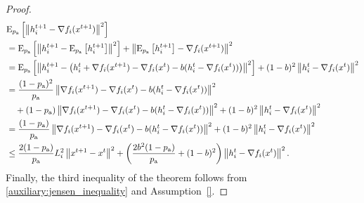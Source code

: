 \documentclass{article}
\newcommand*{\probavailable}{\ensuremath{p_{\textnormal{a}}}}
\begin{document}
\begin{proof}
  \begin{align*}
    &\ExpSub{\probavailable}{\norm{h^{t+1}_i - \nabla f_i(x^{t+1})}^2} \\
    &=\ExpSub{\probavailable}{\norm{h^{t+1}_i - \ExpSub{\probavailable}{h^{t+1}_i}}^2} + \norm{\ExpSub{\probavailable}{h^{t+1}_i  } - \nabla f_i(x^{t+1})}^2 \\
    &=\ExpSub{\probavailable}{\norm{h^{t+1}_i - \left(h^{t}_i + \nabla f_i(x^{t+1}) - \nabla f_i(x^{t}) - b(h^t_i - \nabla f_i(x^{t}))\right)}^2} + (1 - b)^2 \norm{h^{t}_i - \nabla f_i(x^{t})}^2 \\
    &=\frac{(1 - \probavailable)^2}{\probavailable} \norm{\nabla f_i(x^{t+1}) - \nabla f_i(x^{t}) - b(h^t_i - \nabla f_i(x^{t}))}^2 \\
    &\quad + (1 - \probavailable)\norm{\nabla f_i(x^{t+1}) - \nabla f_i(x^{t}) - b(h^t_i - \nabla f_i(x^{t}))}^2 + (1 - b)^2 \norm{h^{t}_i - \nabla f_i(x^{t})}^2 \\
    &=\frac{(1 - \probavailable)}{\probavailable} \norm{\nabla f_i(x^{t+1}) - \nabla f_i(x^{t}) - b(h^t_i - \nabla f_i(x^{t}))}^2 + (1 - b)^2 \norm{h^{t}_i - \nabla f_i(x^{t})}^2 \\
    &\leq \frac{2(1 - \probavailable)}{\probavailable} L^2_i \norm{x^{t+1} - x^{t}}^2 + \left(\frac{2 b^2 (1 - \probavailable)}{\probavailable} + (1 - b)^2\right) \norm{h^{t}_i - \nabla f_i(x^{t})}^2.
  \end{align*}
  Finally, the third inequality of the theorem follows from \eqref{auxiliary:jensen_inequality} and Assumption~\ref{}.
\end{proof}

\CONVERGENCE*
\end{document}

